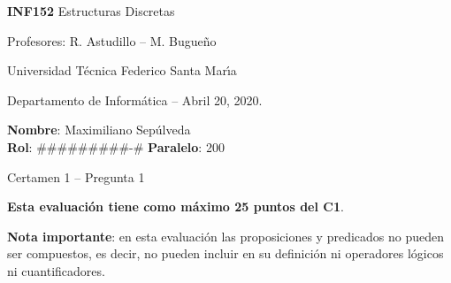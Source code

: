 \documentclass[legalpaper,10pt]{article}
\begin{document}
\thispagestyle{empty}

\begin{minipage}[t]{0.6\textwidth}

{\LARGE \textbf{INF152} Estructuras Discretas}

{\large Profesores: R. Astudillo -- M. Bugueño}

Universidad T\'ecnica Federico Santa Mar\'{\i}a

Departamento de Inform\'atica -- Abril 20, 2020.

\end{minipage}
\hfill
\begin{minipage}[t]{0.35\textwidth}
\textbf{Nombre}: Maximiliano Sepúlveda\\[0.3cm]
\textbf{Rol}: #########-# \textbf{Paralelo}: 200
\end{minipage}

\vspace{0.8cm}

{\Large Certamen 1 -- Pregunta 1}

\vspace{0.4cm}

\textbf{Esta evaluación tiene como máximo 25 puntos del C1}.

\textbf{Nota importante}: en esta evaluación las proposiciones y predicados no pueden ser compuestos, es decir, no pueden incluir en su definición ni operadores lógicos ni cuantificadores.
\end{document}
